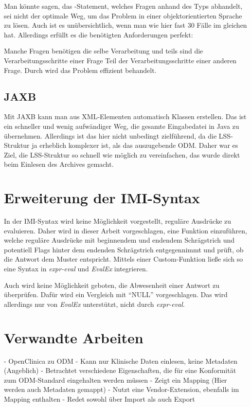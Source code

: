Man könnte sagen, das -Statement, welches Fragen anhand des Typs abhandelt, sei nicht der optimale Weg, um das Problem in einer objektorientierten Sprache zu lösen.
Auch ist es unübersichtlich, wenn man wie hier fast 30 Fälle im gleichen  hat.
Allerdings erfüllt es die benötigten Anforderungen perfekt:

Manche Fragen benötigen die selbe Verarbeitung und teils sind die Verarbeitungsschritte einer Frage Teil der Verarbeitungsschritte einer anderen Frage.
Durch  wird das Problem effizient behandelt.

\subsection{JAXB}

Mit JAXB kann man aus XML-Elementen automatisch Klassen erstellen. Das ist ein schneller und wenig aufwändiger Weg, die gesamte Eingabedatei in Java zu übernehmen.
Allerdings ist das hier nicht unbedingt zielführend, da die LSS-Struktur ja erheblich komplexer ist, als das auszugebende ODM.
Daher war es Ziel, die LSS-Struktur so schnell wie möglich zu vereinfachen, das wurde direkt beim Einlesen des Archives gemacht.

\section{Erweiterung der IMI-Syntax}
\label{d:imi}

In der IMI-Syntax wird keine Möglichkeit vorgestellt, reguläre Ausdrücke zu evaluieren.
Daher wird in dieser Arbeit vorgeschlagen, eine Funktion  einzuführen, welche reguläre Ausdrücke mit beginnendem und endendem Schrägstrich und potentiell Flags hinter dem endenden Schrägstrich entgegennimmt und prüft, ob die Antwort dem Muster entspricht.
Mittels einer Custom-Funktion ließe sich so eine Syntax in \textit{expr-eval} und \textit{EvalEx} integrieren.

Auch wird keine Möglichkeit geboten, die Abwesenheit einer Antwort zu überprüfen. Dafür wird ein Vergleich mit \enquote{NULL} vorgeschlagen.
Das wird allerdings nur von \textit{EvalEx} unterstützt, nicht durch \textit{expr-eval}.

\section{Verwandte Arbeiten}

- OpenClinica zu ODM
	- Kann nur Klinische Daten einlesen, keine Metadaten (Angeblich)
	- Betrachtet verschiedene Eigenschaften, die für eine Konformität zum ODM-Standard eingehalten werden müssen
	- Zeigt ein Mapping (Hier werden auch Metadaten gemappt)
	- Nutzt eine Vendor-Extension, ebenfalls im Mapping enthalten
	- Redet sowohl über Import als auch Export
